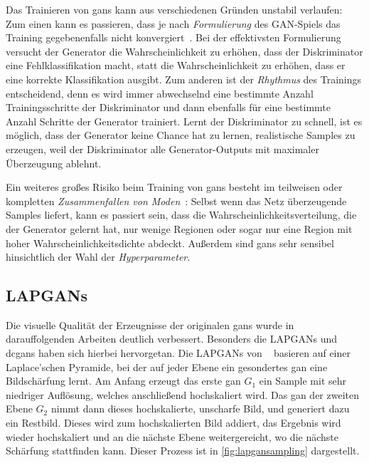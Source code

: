 Das Trainieren von \glspl{gan} kann aus verschiedenen Gründen unstabil verlaufen:
Zum einen kann es passieren, dass je nach \emph{Formulierung} des GAN-Spiels das Training gegebenenfalls nicht konvergiert~\cite{Goodfellow.2014}.
Bei der effektivsten Formulierung versucht der Generator die Wahrscheinlichkeit zu erhöhen, dass der Diskriminator eine Fehlklassifikation macht, statt die Wahrscheinlichkeit zu erhöhen, dass er eine korrekte Klassifikation ausgibt.
Zum anderen ist der \emph{Rhythmus} des Trainings entscheidend, denn es wird immer abwechselnd eine bestimmte Anzahl Trainingsschritte der Diskriminator und dann ebenfalls für eine bestimmte Anzahl Schritte der Generator trainiert.
Lernt der Diskriminator zu schnell, ist es möglich, dass der Generator keine Chance hat zu lernen, realistische Samples zu erzeugen, weil der Diskriminator alle Generator-Outputs mit maximaler Überzeugung ablehnt.

Ein weiteres großes Risiko beim Training von \glspl{gan} besteht im teilweisen oder kompletten \emph{Zusammenfallen von Moden}~\cite{Che.2016}:
Selbst wenn das Netz überzeugende Samples liefert, kann es passiert sein, dass die Wahrscheinlichkeitsverteilung, die der Generator gelernt hat, nur wenige Regionen oder sogar nur eine Region mit hoher Wahrscheinlichkeitsdichte abdeckt.
Außerdem sind \glspl{gan} sehr sensibel hinsichtlich der Wahl der \emph{Hyperparameter}.



\subsection{LAPGANs}

Die visuelle Qualität der Erzeugnisse der originalen \glspl{gan} wurde in darauffolgenden Arbeiten deutlich verbessert.
Besonders die LAPGANs und \glspl{dcgan} haben sich hierbei hervorgetan.
Die LAPGANs von \citeauthor{Denton.2015}~\cite{Denton.2015} basieren auf einer Laplace'schen Pyramide, bei der auf jeder Ebene ein gesondertes \gls{gan} eine Bildschärfung lernt.
Am Anfang erzeugt das erste \gls{gan} $ G_1 $ ein Sample mit sehr niedriger Auflösung, welches anschließend hochskaliert wird.
Das \gls{gan} der zweiten Ebene $ G_2 $ nimmt dann dieses hochskalierte, unscharfe Bild, und generiert dazu ein Restbild.
Dieses wird zum hochskalierten Bild addiert, das Ergebnis wird wieder hochskaliert und an die nächste Ebene weitergereicht, wo die nächste Schärfung stattfinden kann.
Dieser Prozess ist in \autoref{fig:lapgansampling} dargestellt.

